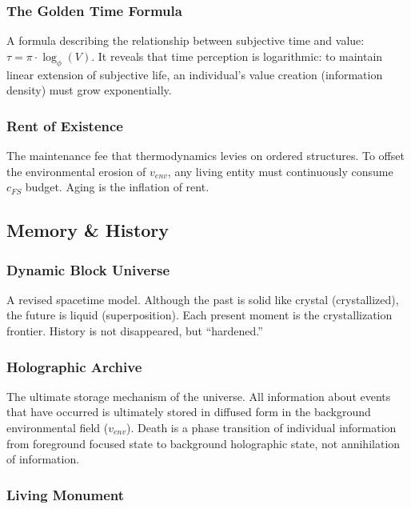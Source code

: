 \subsubsection{The Golden Time Formula}

A formula describing the relationship between subjective time and value: $\tau = \pi \cdot \log_{\phi} (V)$. It reveals that time perception is logarithmic: to maintain linear extension of subjective life, an individual's value creation (information density) must grow exponentially.

\subsubsection{Rent of Existence}

The maintenance fee that thermodynamics levies on ordered structures. To offset the environmental erosion of $v_{env}$, any living entity must continuously consume $c_{FS}$ budget. Aging is the inflation of rent.

\subsection{Memory \& History}

\subsubsection{Dynamic Block Universe}

A revised spacetime model. Although the past is solid like crystal (crystallized), the future is liquid (superposition). Each present moment is the crystallization frontier. History is not disappeared, but ``hardened.''

\subsubsection{Holographic Archive}

The ultimate storage mechanism of the universe. All information about events that have occurred is ultimately stored in diffused form in the background environmental field ($v_{env}$). Death is a phase transition of individual information from foreground focused state to background holographic state, not annihilation of information.

\subsubsection{Living Monument}

